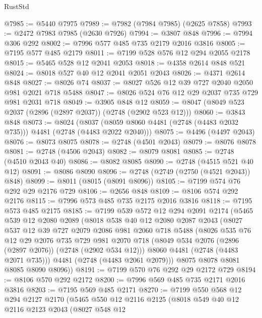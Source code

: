 \begin{lexlean}{RustStd}
\begin{coremodule}
@7985 := @5440 @7975
@7989 := @7982 (@7984 @7985) (@2625 @7858)
@7993 := @2472 @7983 @7985 (@2630 @7926)
@7994 := @3807 @848
@7996 := @7994 @306 @292
@8002 := @7996 @577 @485 @735 @2179 @2016 @3816
@8005 := @7195 @577 @485 @2179
@8011 := @7199 @528 @576 @12 @294 @2055 @2178
@8015 := @5465 @528 @12 @2041 @2053
@8018 := @4358 @2614 @848 @521
@8024 := @8018 @527 @40 @12 @2041 @2051 @2043
@8026 := @4371 @2614 @848
@8027 := @8026 @74
@8037 := @8027 @526 @12 @39 @727 @2040 @2050 @981 @2021 @718 @5488
@8047 := @8026 @524 @76 @12 @29 @2037 @735 @729 @981 @2031 @718
@8049 := @3905 @848 @12
@8059 := @8047 (@8049 @523 @2037 (@2896 (@2897 @2037)) (@2748 (@2902 @523 @12)))
@8060 := @3843 @848
@8073 := @8024
    (@8037 (@8059 @8060 @4481 (@2748 (@4483 @2032 @735))) @4481 (@2748 (@4483 @2022 @2040)))
@8075 := @4496 (@4497 @2043)
@8076 := @8073 @8075
@8078 := @2748 (@4501 @2043)
@8079 := @8076 @8078
@8081 := @2748 (@4506 @2043)
@8082 := @8079 @8081
@8085 := @2748 (@4510 @2043 @40)
@8086 := @8082 @8085
@8090 := @2748 (@4515 @521 @40 @12)
@8091 := @8086 @8090
@8096 := @2748 (@2749 (@2750 (@4521 @2043)) @848)
@8099 := @8011 (@8015 (@8091 @8096))
@8105 := @7199 @574 @76 @292 @29 @2176 @729
@8106 := @2656 @848
@8109 := @8106 @574 @292 @2176
@8115 := @7996 @573 @485 @735 @2175 @2016 @3816
@8118 := @7195 @573 @485 @2175
@8185 := @7199
    @539
    @572
    @12
    @294
    @2091
    @2174
    (@5465
      @539
      @12
      @2080
      @2089
      (@8018
        @538
        @40
        @12
        @2080
        @2087
        @2043
        (@8027
          @537
          @12
          @39
          @727
          @2079
          @2086
          @981
          @2060
          @718
          @5488
          (@8026
            @535
            @76
            @12
            @29
            @2076
            @735
            @729
            @981
            @2070
            @718
            (@8049 @534 @2076 (@2896 (@2897 @2076)) (@2748 (@2902 @534 @12)))
            @8060
            @4481
            (@2748 (@4483 @2071 @735)))
          @4481
          (@2748 (@4483 @2061 @2079)))
        @8075
        @8078
        @8081
        @8085
        @8090
        @8096))
@8191 := @7199 @570 @76 @292 @29 @2172 @729
@8194 := @8106 @570 @292 @2172
@8200 := @7996 @569 @485 @735 @2171 @2016 @3816
@8203 := @7195 @569 @485 @2171
@8270 := @7199
    @550
    @568
    @12
    @294
    @2127
    @2170
    (@5465
      @550
      @12
      @2116
      @2125
      (@8018
        @549
        @40
        @12
        @2116
        @2123
        @2043
        (@8027
          @548
          @12

\end{coremodule}
\end{lexlean}
